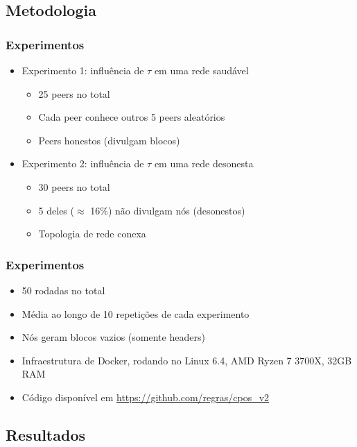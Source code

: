 \documentclass{beamer}
\begin{document}
\subsection{Metodologia}
\begin{frame}
\frametitle{Experimentos}
\begin{itemize}
    \pause
    \item Experimento 1: influência de $\tau$ em uma rede saudável
    \begin{itemize}
        \item 25 peers no total
        \item Cada peer conhece outros 5 peers aleatórios
        \item Peers honestos (divulgam blocos)
    \end{itemize}
    \pause
    \item Experimento 2: influência de $\tau$ em uma rede desonesta
    \begin{itemize}
        \item 30 peers no total
        \item 5 deles ($\approx$ 16\%) não divulgam nós (desonestos)
        \item Topologia de rede conexa
    \end{itemize}
\end{itemize}
\end{frame}

\begin{frame}
\frametitle{Experimentos}
\begin{itemize}
    \item 50 rodadas no total
    \item Média ao longo de 10 repetições de cada experimento
    \item Nós geram blocos vazios (somente headers)
    \item Infraestrutura de Docker, rodando no Linux 6.4, AMD Ryzen 7 3700X, 32GB RAM
    \item Código disponível em \url{https://github.com/regras/cpos_v2}
\end{itemize}
\end{frame}

\subsection{Resultados}
\end{document}
